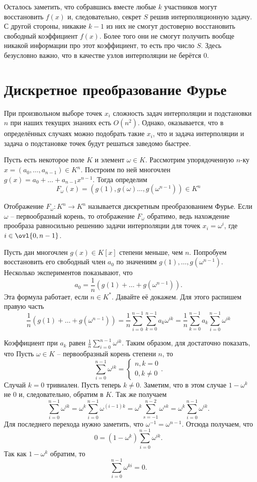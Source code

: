 Осталось заметить, что собравшись вместе любые $k$ участников могут восстановить  $f(x)$
и, следовательно, секрет $S$ решив интерполяционную задачу. С другой стороны, никакие $k-1$ из них не смогут достоверно восстановить свободный коэффициент $f(x)$. Более того они не смогут получить вообще никакой информации про этот коэффициент, то есть про число $S$. Здесь безусловно важно, что в качестве узлов интерполяции не берётся 0.


\section{Дискретное преобразование Фурье}

При произвольном выборе точек $x_i$ сложность задач интерполяции и подстановки $n$ при наших текущих знаниях есть $O(n^2)$. Однако, оказывается, что в определённых случаях можно подобрать такие $x_i$, что и задача интерполяции и задача о подстановке точек будут решаться заведомо быстрее.

Пусть есть некоторое поле $K$ и элемент $\omega \in K$. Рассмотрим упорядоченную $n$-ку $x=(a_0,\dots,a_{n-1})\in K^n$. Построим по ней многочлен $g(x)=a_0+\dots+a_{n-1}x^{n-1}$. Тогда определим $$F_{\omega}(x)=(g(1), g(\omega)\dots,g(\omega^{n-1}))\in K^n$$


Отображение $F_{\omega}\colon K^n \to K^n$ называется дискретным преобразованием Фурье. Если $\omega$ -- первообразный корень, то отображение $F_{\omega}$ обратимо, ведь нахождение прообраза равносильно решению задачи интерполяции для точек $x_i=\omega^i$, где $i\in \ovl{0,n-1}$. 

Пусть дан многочлен $g(x) \in K[x]$ степени меньше, чем $n$. Попробуем восстановить его свободный член $a_0$ по значениям $g(1),\dots,g(\omega^{n-1})$. Несколько экспериментов показывают, что 
$$a_0=\frac{1}{n}\left(g(1)+\dots+g(\omega^{n-1})\right).$$
Эта формула работает, если $n \in K^*$. Давайте её докажем. Для этого распишем правую часть
$$\frac{1}{n}\left(g(1)+\dots+g(\omega^{n-1})\right)=\frac{1}{n}\sum_{i=0}^{n-1} \sum_{k=0}^{n-1} a_k \omega^{ik}=\frac{1}{n}\sum_{k=0}^{n-1} a_k\sum_{i=0}^{n-1} \omega^{ik}$$

Коэффициент при $a_k$ равен $\frac{1}{n} \sum_{i=0}^{n-1}\omega^{ik}$. Таким образом, для  достаточно показать, что
\lm Пусть $\omega \in K$ -- первообразный корень степени $n$, то $$\sum_{i=0}^{n-1}\omega^{ik}=\begin{cases} n, k=0\\
0, k\neq 0
\end{cases}.$$
\elm
\proof Случай $k=0$ тривиален. Пусть теперь $k\neq 0$. Заметим, что в этом случае $1-\omega^{k}$ не $0$ и, следовательно, обратим в $K$. Так же получаем
$$\sum_{i=0}^{n-1}\omega^{ik}=\omega^{k}\sum_{i=0}^{n-1} \omega^{(i-1)k}=\omega^{k}\sum_{s=-1}^{n-2} \omega^{sk}=\omega^{k}\sum_{i=0}^{n-1} \omega^{ik}.$$
Для последнего перехода нужно заметить, что $\omega^{-1}=\omega^{n-1}$. Отсюда получаем, что 
$$0=(1-\omega^k)\sum_{i=0}^{n-1} \omega^{ik}.$$
Так как $1-\omega^k$ обратим, то  $$\sum_{i=0}^{n-1}\omega^{ki}=0.$$
\endproof


